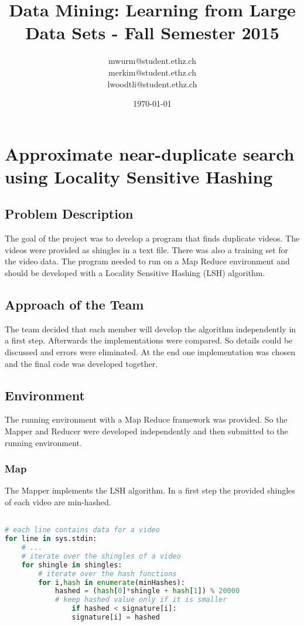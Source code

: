 \documentclass[a4paper, 11pt]{article}
\title{Data Mining: Learning from Large Data Sets - Fall Semester 2015}
\author{mwurm@student.ethz.ch\\ merkim@student.ethz.ch\\ lwoodtli@student.ethz.ch\\}
\date{\today}
\begin{document}
\maketitle

\section*{Approximate near-duplicate search using Locality Sensitive Hashing} 

\subsection{Problem Description}

The goal of the project was to develop a program that finds duplicate videos.
The videos were provided as shingles in a text file. There was also a training
set for the video data.
The program needed to run on a Map Reduce environment and should be developed
with a Locality Sensitive Hashing (LSH) algorithm.

\subsection{Approach of the Team}
The team decided that each member will develop the algorithm independently in a first step.
Afterwards the implementations were compared. So details could be
discussed and errors were eliminated. At the end one implementation was chosen and the final code was developed together.

\subsection{Environment}
The running environment with a Map Reduce framework was provided. So the
Mapper and Reducer were developed independently and then submitted to
the running environment.

\subsubsection{Map}

The Mapper implements the LSH algorithm. In a first step the provided shingles of each video are min-hashed.

\begin{lstlisting}[language=Python]

# each line contains data for a video
for line in sys.stdin:
	# ...
	# iterate over the shingles of a video
	for shingle in shingles:
		# iterate over the hash functions
		for i,hash in enumerate(minHashes):
			hashed = (hash[0]*shingle + hash[1]) % 20000
			# keep hashed value only if it is smaller 
				if hashed < signature[i]:
				signature[i] = hashed
\end{lstlisting}
\end{document}

